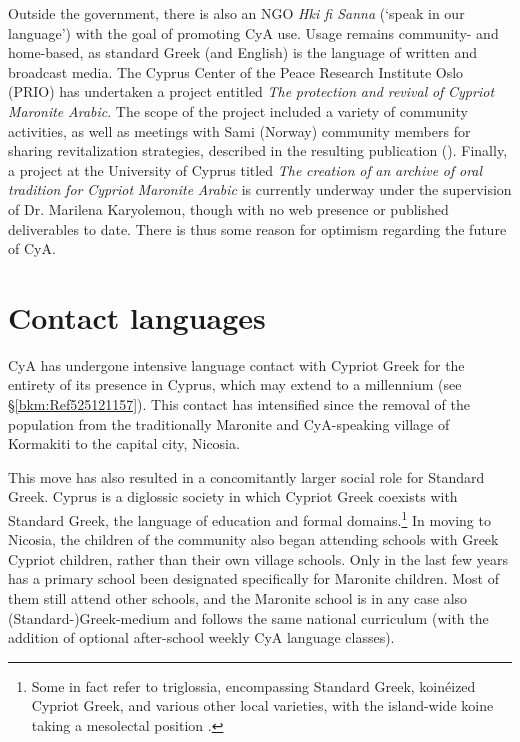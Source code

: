 \documentclass[output=paper]{langsci/langscibook}
\begin{document}
Outside the government, there is also an NGO \textit{Hki fi Sanna} (‘speak in our language’) with the goal of promoting CyA use. Usage remains community- and home-based, as standard Greek (and English) is the language of written and broadcast media. The Cyprus Center of the Peace Research Institute Oslo (PRIO) has undertaken a project entitled \textit{The} \textit{protection} \textit{and} \textit{revival} \textit{of} \textit{Cypriot} \textit{Maronite} \textit{Arabic}. The scope of the project included a variety of community activities, as well as meetings with Sami (Norway) community members for sharing revitalization strategies, described in the resulting publication (\citealt{PRIO2009}). Finally, a project at the University of Cyprus titled \textit{The} \textit{creation} \textit{of} \textit{an} \textit{archive} \textit{of} \textit{oral} \textit{tradition} \textit{for} \textit{Cypriot} \textit{Maronite} \textit{Arabic} is currently underway under the supervision of Dr. Marilena Karyolemou, though with no web presence or published deliverables to date. There is thus some reason for optimism regarding the future of CyA.

\section{\label{bkm:Ref525122525}Contact languages}

CyA has undergone intensive language contact with Cypriot Greek for the entirety of its presence in Cyprus, which may extend to a millennium (see §\ref{bkm:Ref525121157}). This contact has intensified since the removal of the population from the traditionally Maronite and CyA-speaking village of Kormakiti to the capital city, Nicosia. 

This move has also resulted in a concomitantly larger social role for Standard Greek. Cyprus is a diglossic society in which Cypriot Greek coexists with Standard Greek, the language of education and formal domains.\footnote{Some in fact refer to triglossia, encompassing Standard Greek, koinéized Cypriot Greek, and various other local varieties, with the island-wide koine taking a mesolectal position \citep{Arvaniti2010}.} In moving to Nicosia, the children of the community also began attending schools with Greek Cypriot children, rather than their own village schools. Only in the last few years has a primary school been designated specifically for Maronite children. Most of them still attend other schools, and the Maronite school is in any case also (Standard-)Greek-medium and follows the same national curriculum (with the addition of optional after-school weekly CyA language classes).
\end{document}
